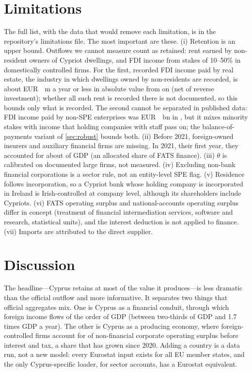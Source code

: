 \documentclass[11pt]{article}
\newcommand{\EUR}{EUR~}
\begin{document}
\section{Limitations}
\label{sec:limits}

The full list, with the data that would remove each limitation, is in the repository's limitations file.
The most important are these.
(i) Retention is an upper bound.
Outflows we cannot measure count as retained: rent earned by non-resident owners of Cypriot dwellings, and FDI income from stakes of 10--50\% in domestically controlled firms.
For the first, recorded FDI income paid by real estate, the industry in which dwellings owned by non-residents are recorded, is about \EUR\RealEstateFdiAbsMax~m a year or less in absolute value from \RealEstateFdiFirstYear{} on (net of reverse investment); whether all such rent is recorded there is not documented, so this bounds only what is recorded.
The second cannot be separated in published data: FDI income paid by non-SPE enterprises was \EUR\NonSPEFDILastEUR~bn in \LastYear, but it mixes minority stakes with income that holding companies with staff pass on; the balance-of-payments variant of \cref{sec:robust} bounds both.
(ii) Before 2021, foreign-owned insurers and auxiliary financial firms are missing.
In 2021, their first year, they accounted for about \InsAuxShareFirstFats{} of GDP (an allocated share of FATS finance).
(iii) $\theta$ is calibrated on documented large firms, not measured.
(iv) Excluding non-bank financial corporations is a sector rule, not an entity-level SPE flag.
(v) Residence follows incorporation, so a Cypriot bank whose holding company is incorporated in Ireland is Irish-controlled at company level, although its shareholders include Cypriots.
(vi) FATS operating surplus and national-accounts operating surplus differ in concept (treatment of financial intermediation services, software and research, statistical units), and the interest deduction is not applied to finance.
(vii) Imports are attributed to the direct supplier.

\section{Discussion}
\label{sec:discussion}

The headline---Cyprus retains at most \DVRLast{} of the value it produces---is less dramatic than the official outflow and more informative.
It separates two things that official aggregates mix.
One is Cyprus as a financial conduit, through which foreign income flows of the order of GDP (between two-thirds of GDP and 1.7 times GDP a year).
The other is Cyprus as a producing economy, where foreign-controlled firms account for \FOCLast{} of non-financial corporate operating surplus before interest and tax, a share that has grown since 2020.
Adding a country is a data run, not a new model: every Eurostat input exists for all EU member states, and the only Cyprus-specific loader, for sector accounts, has a Eurostat equivalent.
\end{document}
